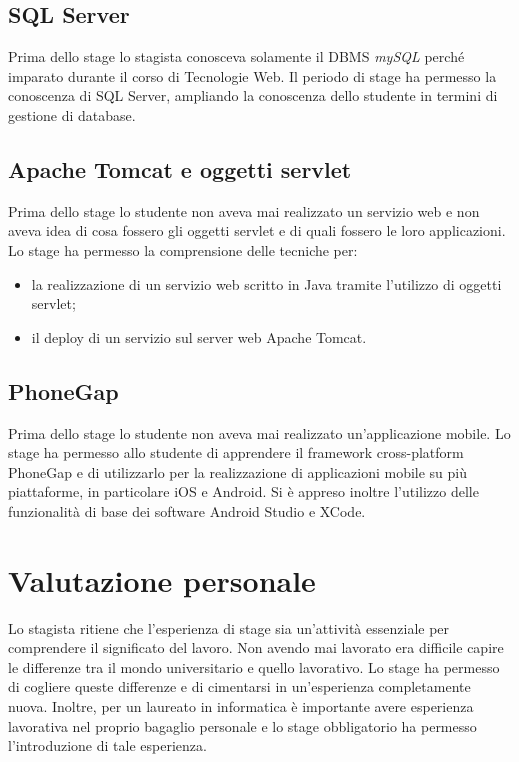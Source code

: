 \subsection{SQL Server}

Prima dello stage lo stagista conosceva solamente il DBMS \textit{mySQL} perché imparato durante il corso di Tecnologie Web. Il periodo di stage ha permesso la conoscenza di SQL Server, ampliando la conoscenza dello studente in termini di gestione di database.

\subsection{Apache Tomcat e oggetti servlet}

Prima dello stage lo studente non aveva mai realizzato un servizio web e non aveva idea di cosa fossero gli oggetti servlet e di quali fossero le loro applicazioni. Lo stage ha permesso la comprensione delle tecniche per:
\begin{itemize}
	\item la realizzazione di un servizio web scritto in Java tramite l'utilizzo di oggetti servlet;
	\item il deploy di un servizio sul server web Apache Tomcat.
\end{itemize}

\subsection{PhoneGap}

Prima dello stage lo studente non aveva mai realizzato un'applicazione mobile. Lo stage ha permesso allo studente di apprendere il framework cross-platform PhoneGap e di utilizzarlo per la realizzazione di applicazioni mobile su più piattaforme, in particolare iOS e Android. Si è appreso inoltre l'utilizzo delle funzionalità di base dei software Android Studio e XCode.

\section{Valutazione personale}

Lo stagista ritiene che l'esperienza di stage sia un'attività essenziale per comprendere il significato del lavoro. Non avendo mai lavorato era difficile capire le differenze tra il mondo universitario e quello lavorativo. Lo stage ha permesso di cogliere queste differenze e di cimentarsi in un'esperienza completamente nuova. Inoltre, per un laureato in informatica è importante avere esperienza lavorativa nel proprio bagaglio personale e lo stage obbligatorio ha permesso l'introduzione di tale esperienza.

